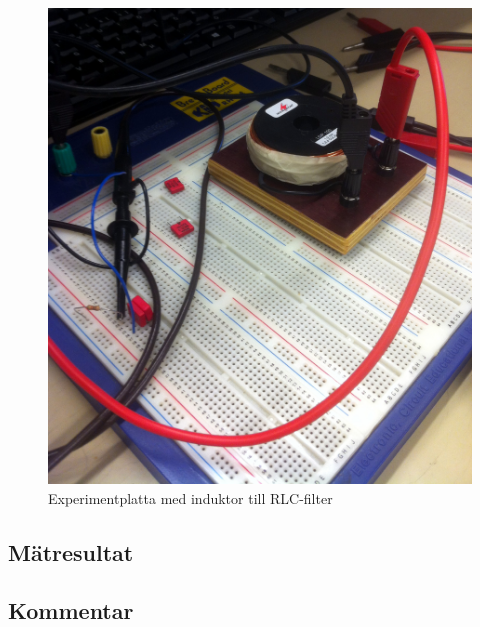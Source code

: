 \documentclass[11pt,a4paper]{article}
\begin{document}
\begin{figure}
    \centering
    \includegraphics[width=0.8\linewidth]{img/foto5}
    \caption[]
    {Experimentplatta med induktor till RLC-filter}
    \label{fig:foto5}
\end{figure}

\subsection{Mätresultat}\label{}

\subsection{Kommentar}\label{}


\end{document}
